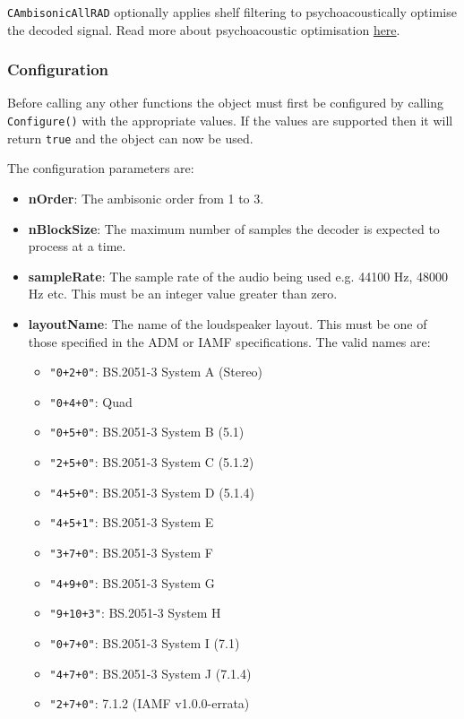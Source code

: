 \documentclass[12pt]{report}
\newcommand{\code}[1]{\texttt{#1}}
\begin{document}
\code{CAmbisonicAllRAD} optionally applies shelf filtering to psychoacoustically optimise the decoded signal. Read more about psychoacoustic optimisation \href{AmbisonicOptimisation.md}{here}.

\subsubsection{Configuration}

Before calling any other functions the object must first be configured by calling \code{Configure()} with the appropriate values. If the values are supported then it will return \code{true} and the object can now be used.

The configuration parameters are:
\begin{itemize}
    \item \textbf{nOrder}: The ambisonic order from 1 to 3.
    \item \textbf{nBlockSize}: The maximum number of samples the decoder is expected to process at a time.
    \item \textbf{sampleRate}: The sample rate of the audio being used e.g. 44100 Hz, 48000 Hz etc. This must be an integer value greater than zero.
    \item \textbf{layoutName}: The name of the loudspeaker layout. This must be one of those specified in the ADM or IAMF specifications. The valid names are:
    \begin{itemize}
        \item \code{"0+2+0"}: BS.2051-3 System A (Stereo)
        \item \code{"0+4+0"}: Quad
        \item \code{"0+5+0"}: BS.2051-3 System B (5.1)
        \item \code{"2+5+0"}: BS.2051-3 System C (5.1.2)
        \item \code{"4+5+0"}: BS.2051-3 System D (5.1.4)
        \item \code{"4+5+1"}: BS.2051-3 System E
        \item \code{"3+7+0"}: BS.2051-3 System F
        \item \code{"4+9+0"}: BS.2051-3 System G
        \item \code{"9+10+3"}: BS.2051-3 System H
        \item \code{"0+7+0"}: BS.2051-3 System I (7.1)
        \item \code{"4+7+0"}: BS.2051-3 System J (7.1.4)
        \item \code{"2+7+0"}: 7.1.2 (IAMF v1.0.0-errata)

\end{itemize}
\end{itemize}
\end{document}
